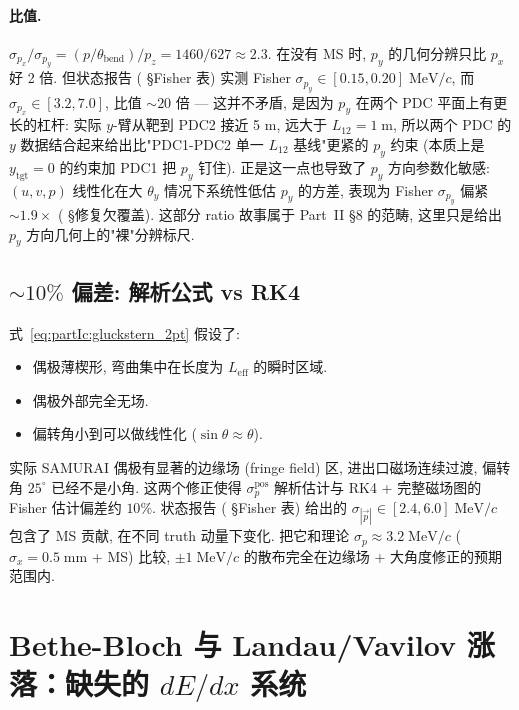 \paragraph{比值.} $\sigma_{p_x} / \sigma_{p_y} = (p / \theta_\mathrm{bend}) / p_z = 1460 / 627 \approx 2.3$. 在没有 MS 时, $p_y$ 的几何分辨只比 $p_x$ 好 2 倍. 但状态报告 (\StatusReport{} §Fisher 表) 实测 Fisher $\sigma_{p_y} \in [0.15, 0.20]\;\mathrm{MeV}/c$, 而 $\sigma_{p_x} \in [3.2, 7.0]$, 比值 $\sim 20$ 倍 — 这并不矛盾, 是因为 $p_y$ 在两个 PDC 平面上有更长的杠杆: 实际 $y$-臂从靶到 PDC2 接近 5 m, 远大于 $L_{12} = 1\;\mathrm{m}$, 所以两个 PDC 的 $y$ 数据结合起来给出比"PDC1-PDC2 单一 $L_{12}$ 基线"更紧的 $p_y$ 约束 (本质上是 $y_\mathrm{tgt} = 0$ 的约束加 PDC1 把 $p_y$ 钉住). 正是这一点也导致了 $p_y$ 方向参数化敏感: $(u, v, p)$ 线性化在大 $\theta_y$ 情况下系统性低估 $p_y$ 的方差, 表现为 Fisher $\sigma_{p_y}$ 偏紧 $\sim 1.9\times$ (\StatusReport{} §修复欠覆盖). 这部分 ratio 故事属于 Part~II §8 的范畴, 这里只是给出 $p_y$ 方向几何上的"裸"分辨标尺.

\subsection{$\sim 10\%$ 偏差: 解析公式 vs RK4}

式~\eqref{eq:partIc:gluckstern_2pt} 假设了:
\begin{itemize}[nosep, leftmargin=2em]
  \item 偶极薄楔形, 弯曲集中在长度为 $L_\mathrm{eff}$ 的瞬时区域.
  \item 偶极外部完全无场.
  \item 偏转角小到可以做线性化 ($\sin\theta \approx \theta$).
\end{itemize}

实际 SAMURAI 偶极有显著的边缘场 (fringe field) 区, 进出口磁场连续过渡, 偏转角 $25^\circ$ 已经不是小角. 这两个修正使得 $\sigma_p^\mathrm{pos}$ 解析估计与 RK4 + 完整磁场图的 Fisher 估计偏差约 $10\%$. 状态报告 (\StatusReport{} §Fisher 表) 给出的 $\sigma_{|\vec p|} \in [2.4, 6.0]\;\mathrm{MeV}/c$ 包含了 MS 贡献, 在不同 truth 动量下变化. 把它和理论 $\sigma_p \approx 3.2\;\mathrm{MeV}/c$ ($\sigma_x = 0.5\;\mathrm{mm}$ + MS) 比较, $\pm 1\;\mathrm{MeV}/c$ 的散布完全在边缘场 + 大角度修正的预期范围内.


\section{Bethe-Bloch 与 Landau/Vavilov 涨落：缺失的 $dE/dx$ 系统}
\label{sec:partIc:bethe_bloch}

